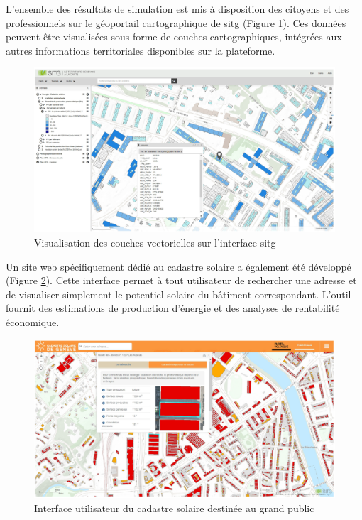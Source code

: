 L'ensemble des résultats de simulation est mis à disposition des citoyens et des professionnels sur le géoportail cartographique de \acrshort{sitg} (Figure \ref{fig:cadastre_solaire_couche_vec_sitg}). Ces données peuvent être visualisées sous forme de couches cartographiques, intégrées aux autres informations territoriales disponibles sur la plateforme.

\begin{figure}[H]
    \centering
    \includegraphics[width=1\linewidth]{02-main//figures/ch2/cadastre_solaire_couche_vec_sitg.png}
    \caption{Visualisation des couches vectorielles sur l'interface \acrshort{sitg} \cite{desthieux_solar_2018}}
    \label{fig:cadastre_solaire_couche_vec_sitg}
\end{figure}

Un site web spécifiquement dédié au cadastre solaire a également été développé (Figure \ref{fig:cadastre_solaire_sitg_labs}). Cette interface permet à tout utilisateur de rechercher une adresse et de visualiser simplement le potentiel solaire du bâtiment correspondant. L'outil fournit des estimations de production d'énergie et des analyses de rentabilité économique.

\begin{figure}[H]
    \centering
    \includegraphics[width=1\linewidth]{02-main//figures/ch2/cadastre_solaire_sitg_labs.png}
    \caption{Interface utilisateur du cadastre solaire destinée au grand public \cite{desthieux_solar_2018}}
    \label{fig:cadastre_solaire_sitg_labs}
\end{figure}

